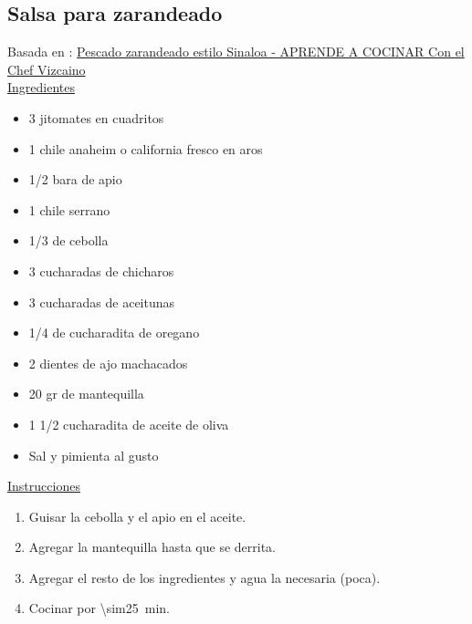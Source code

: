 \subsection{Salsa para zarandeado}

Basada en : \href{https://aprendeacocinarfacil.wordpress.com/2012/03/13/pescado-sarandeado-estilo-sinaloa-aya-pinchi/}{Pescado zarandeado estilo Sinaloa - APRENDE A COCINAR Con el Chef Vizcaino} \\

\underline{Ingredientes}
\begin{itemize}
\item 3 jitomates en cuadritos
\item 1 chile anaheim o california fresco en aros
\item 1/2 bara de apio
\item 1 chile serrano
\item 1/3 de cebolla
\item 3 cucharadas de chicharos
\item 3 cucharadas de aceitunas
\item 1/4 de cucharadita de oregano
\item 2 dientes de ajo machacados
\item 20 gr de mantequilla
\item 1 1/2 cucharadita de aceite de oliva
\item Sal y pimienta al gusto
\end{itemize}


\underline{Instrucciones}
\begin{enumerate}
\item Guisar la cebolla y el apio en el aceite.
\item Agregar la mantequilla hasta que se derrita.
\item Agregar el resto de los ingredientes y agua la necesaria (poca).
\item Cocinar por \SI{\sim25}{min}.
\end{enumerate}
